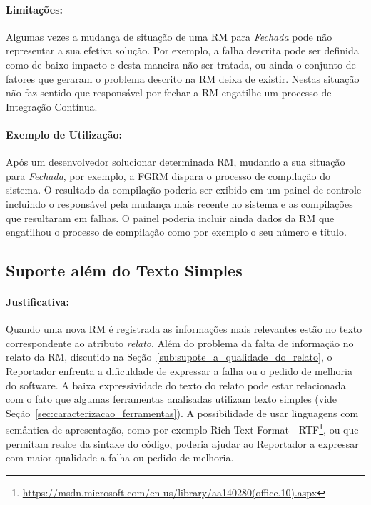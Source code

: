 \paragraph{Limitações:}\label{par:limitacoes_s05}

Algumas vezes a mudança de situação de uma RM para \textit{Fechada} pode não
representar a sua efetiva solução. Por exemplo, a falha descrita pode ser
definida como de baixo impacto e desta maneira não ser tratada, ou ainda o
conjunto de fatores que geraram o problema descrito na RM deixa de existir.
Nestas situação não faz sentido que responsável por fechar a RM engatilhe um
processo de Integração Contínua.

\paragraph{Exemplo de Utilização:}\label{par:exemplo_de_utilização_s05}

Após um desenvolvedor solucionar determinada RM, mudando a sua situação para
\textit{Fechada}, por exemplo, a FGRM dispara o processo de compilação do
sistema. O resultado da compilação poderia ser exibido em um painel de controle
incluindo o responsável pela mudança mais recente no sistema e as compilações
que resultaram em falhas. O painel poderia incluir ainda dados da RM que
engatilhou o processo de compilação como por exemplo o seu número e título.

\subsection{Suporte além do Texto Simples}\label{sub:suporte_linguagem_marcacao}


\paragraph{Justificativa:}\label{par:justificativa_s06}

Quando uma nova RM é registrada as informações mais relevantes estão no texto
correspondente ao atributo \textit{relato}. Além do problema da falta de
informação no relato da RM, discutido na
Seção~\ref{sub:supote_a_qualidade_do_relato}, o Reportador enfrenta a
dificuldade de expressar a falha ou o pedido de melhoria do software. A baixa
expressividade do texto do relato pode estar relacionada com o fato que algumas
ferramentas analisadas utilizam texto simples (vide
Seção~\ref{sec:caracterizacao_ferramentas}). A possibilidade de usar linguagens
com semântica de apresentação, como por exemplo Rich Text Format \@-\@
RTF\footnote{\url{https://msdn.microsoft.com/en-us/library/aa140280(office.10).aspx}},
ou que permitam realce da sintaxe do código, poderia ajudar ao Reportador a
expressar com maior qualidade a falha ou pedido de melhoria.

